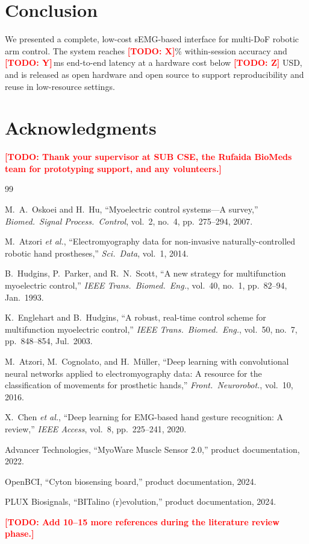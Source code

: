 \documentclass[conference]{IEEEtran}
\newcommand{\todo}[1]{\textcolor{red}{\textbf{[TODO: #1]}}}
\begin{document}
\section{Conclusion}
\label{sec:conclusion}

We presented a complete, low-cost sEMG-based interface for multi-DoF
robotic arm control. The system reaches \todo{X}\% within-session
accuracy and \todo{Y}\,ms end-to-end latency at a hardware cost below
\todo{Z} USD, and is released as open hardware and open source to
support reproducibility and reuse in low-resource settings.

\section*{Acknowledgments}
\todo{Thank your supervisor at SUB CSE, the Rufaida BioMeds team for
prototyping support, and any volunteers.}


\begin{thebibliography}{99}

M.~A.\ Oskoei and H.\ Hu, ``Myoelectric control systems---A survey,''
\emph{Biomed.\ Signal Process.\ Control}, vol.~2, no.~4, pp.~275--294, 2007.

M.\ Atzori \emph{et al.}, ``Electromyography data for non-invasive
naturally-controlled robotic hand prostheses,'' \emph{Sci.\ Data}, vol.~1,
2014.

B.\ Hudgins, P.\ Parker, and R.\ N.\ Scott, ``A new strategy for
multifunction myoelectric control,'' \emph{IEEE Trans.\ Biomed.\ Eng.},
vol.~40, no.~1, pp.~82--94, Jan.\ 1993.

K.\ Englehart and B.\ Hudgins, ``A robust, real-time control scheme for
multifunction myoelectric control,'' \emph{IEEE Trans.\ Biomed.\ Eng.},
vol.~50, no.~7, pp.~848--854, Jul.\ 2003.

M.\ Atzori, M.\ Cognolato, and H.\ M{\"u}ller, ``Deep learning with
convolutional neural networks applied to electromyography data: A
resource for the classification of movements for prosthetic hands,''
\emph{Front.\ Neurorobot.}, vol.~10, 2016.

X.\ Chen \emph{et al.}, ``Deep learning for EMG-based hand gesture
recognition: A review,'' \emph{IEEE Access}, vol.~8, pp.~225--241, 2020.

Advancer Technologies, ``MyoWare Muscle Sensor 2.0,'' product
documentation, 2022.

OpenBCI, ``Cyton biosensing board,'' product documentation, 2024.

PLUX Biosignals, ``BITalino (r)evolution,'' product documentation, 2024.

\todo{Add 10--15 more references during the literature review phase.}

\end{thebibliography}
\end{document}
